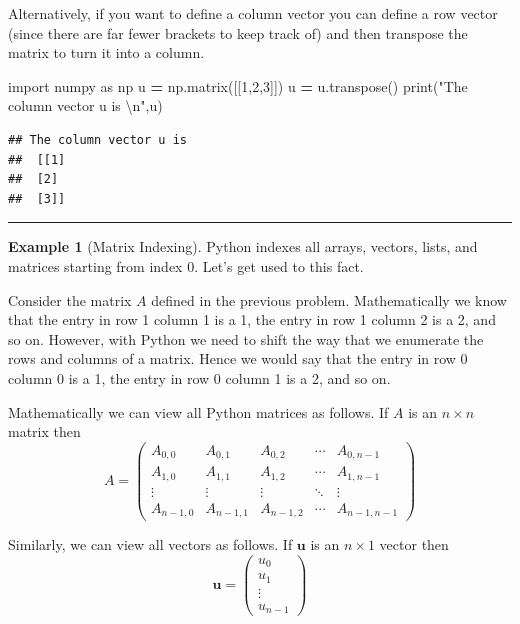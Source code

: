 \documentclass[
]{book}
\newenvironment{Shaded}{\begin{snugshade}}{\end{snugshade}}
\newcommand{\BuiltInTok}[1]{#1}
\newcommand{\CharTok}[1]{\textcolor[rgb]{0.31,0.60,0.02}{#1}}
\newcommand{\DecValTok}[1]{\textcolor[rgb]{0.00,0.00,0.81}{#1}}
\newcommand{\ImportTok}[1]{#1}
\newcommand{\NormalTok}[1]{#1}
\newcommand{\OperatorTok}[1]{\textcolor[rgb]{0.81,0.36,0.00}{\textbf{#1}}}
\newcommand{\StringTok}[1]{\textcolor[rgb]{0.31,0.60,0.02}{#1}}
\theoremstyle{definition}
\theoremstyle{definition}
\newtheorem{example}{Example}[chapter]
\theoremstyle{definition}
\theoremstyle{remark}
\begin{document}
Alternatively, if you want to define a column vector you can define a row vector (since there are far fewer brackets to keep track of) and then transpose the matrix to turn it into a column.

\begin{Shaded}
\begin{Highlighting}[]
\ImportTok{import}\NormalTok{ numpy }\ImportTok{as}\NormalTok{ np}
\NormalTok{u }\OperatorTok{=}\NormalTok{ np.matrix([[}\DecValTok{1}\NormalTok{,}\DecValTok{2}\NormalTok{,}\DecValTok{3}\NormalTok{]])}
\NormalTok{u }\OperatorTok{=}\NormalTok{ u.transpose()}
\BuiltInTok{print}\NormalTok{(}\StringTok{"The column vector u is }\CharTok{\textbackslash{}n}\StringTok{"}\NormalTok{,u)}
\end{Highlighting}
\end{Shaded}

\begin{verbatim}
## The column vector u is 
##  [[1]
##  [2]
##  [3]]
\end{verbatim}

\begin{center}\rule{0.5\linewidth}{0.5pt}\end{center}

\begin{example}[Matrix Indexing]
\protect\hypertarget{exm:unnamed-chunk-282}{}{\label{exm:unnamed-chunk-282} {} }Python indexes all arrays, vectors, lists, and matrices starting from index 0. Let's get used to this fact.

Consider the matrix \(A\) defined in the previous problem. Mathematically we know that the entry in row 1 column 1 is a 1, the entry in row 1 column 2 is a 2, and so on. However, with Python we need to shift the way that we enumerate the rows and columns of a matrix. Hence we would say that the entry in row 0 column 0 is a 1, the entry in row 0 column 1 is a 2, and so on.

Mathematically we can view all Python matrices as follows. If \(A\) is an \(n \times n\) matrix then
\[ A = \begin{pmatrix} A_{0,0} & A_{0,1} & A_{0,2} & \cdots & A_{0,n-1} \\
A_{1,0} & A_{1,1} & A_{1,2} & \cdots & A_{1,n-1} \\ 
\vdots & \vdots & \vdots & \ddots & \vdots \\
A_{n-1,0} & A_{n-1,1} & A_{n-1,2} & \cdots & A_{n-1,n-1} \end{pmatrix} \]

Similarly, we can view all vectors as follows. If \(\boldsymbol{u}\) is an \(n \times 1\) vector then
\[ \boldsymbol{u} = \begin{pmatrix} u_0 \\ u_1 \\ \vdots \\ u_{n-1} \end{pmatrix} \]
\end{example}
\end{document}
